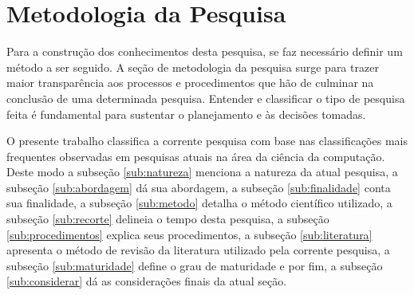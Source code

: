  

 


\section{Metodologia da Pesquisa}\label{sec:metodologia}

Para a construção dos conhecimentos desta pesquisa, se faz necessário definir um método a ser seguido. A seção de metodologia da pesquisa surge para trazer maior transparência aos processos e procedimentos que hão de culminar na conclusão de uma determinada pesquisa. Entender e classificar o tipo de pesquisa feita é fundamental para sustentar o planejamento e às decisões tomadas.








O presente trabalho classifica a corrente pesquisa com base nas classificações mais frequentes observadas em pesquisas atuais na área da ciência da computação. Deste modo a subseção \ref{sub:natureza} menciona a natureza da atual pesquisa, a subseção \ref{sub:abordagem} dá sua abordagem, a subseção \ref{sub:finalidade} conta sua finalidade, a subseção \ref{sub:metodo} detalha o método científico utilizado, a subseção \ref{sub:recorte} delineia o tempo desta pesquisa, a subseção \ref{sub:procedimentos} explica seus procedimentos, a subseção \ref{sub:literatura} apresenta o método de revisão da literatura utilizado pela corrente pesquisa, a subseção \ref{sub:maturidade} define o grau de maturidade e por fim, a subseção \ref{sub:considerar} dá as considerações finais da atual seção. 

